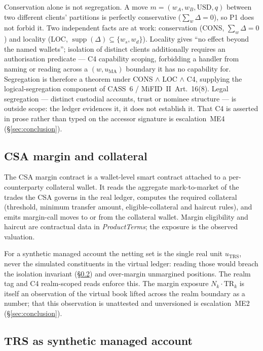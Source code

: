 \documentclass[11pt,a4paper]{article}
\begin{document}
Conservation alone is not segregation. A move $m=(w_A,w_B,\text{USD},q)$ between two different
clients' partitions is perfectly conservative ($\sum_w\Delta=0$), so P1 does not forbid it. Two
independent facts are at work: conservation (CONS, $\sum_w\Delta=0$) and locality (LOC,
$\operatorname{supp}(\Delta)\subseteq\{w_s,w_d\}$). Locality gives ``no effect beyond the named
wallets''; isolation of distinct clients additionally requires an authorisation predicate --- C4
capability scoping, forbidding a handler from naming or reading across a $(w,u_{\mathrm{MA}})$
boundary it has no capability for. Segregation is therefore a theorem under CONS $\wedge$ LOC
$\wedge$ C4, supplying the logical-segregation component of CASS~6 / MiFID~II~Art.~16(8). Legal
segregation --- distinct custodial accounts, trust or nominee structure --- is outside scope: the
ledger evidences it, it does not establish it. That C4 is asserted in prose rather than typed on
the accessor signature is escalation~ME4 (\S\ref{sec:conclusion}).

\subsection{CSA margin and collateral}
\label{sec:managed-csa}

The CSA margin contract is a wallet-level smart contract attached to a per-counterparty collateral
wallet. It reads the aggregate mark-to-market of the trades the CSA governs in the real ledger,
computes the required collateral (threshold, minimum transfer amount, eligible-collateral and
haircut rules), and emits margin-call moves to or from the collateral wallet. Margin eligibility
and haircut are contractual data in \textit{ProductTerms}; the exposure is the observed valuation.

For a synthetic managed account the netting set is the single real unit $u_{\mathrm{TRS}}$, never
the simulated constituents in the virtual ledger: reading those would breach the isolation
invariant (\S\ref{sec:managed-trs}) and over-margin unmargined positions. The realm tag and C4
realm-scoped reads enforce this. The margin exposure $N_k\cdot\mathrm{TR}_k$ is itself an
observation of the virtual book lifted across the realm boundary as a number; that this
observation is unattested and unversioned is escalation~ME2 (\S\ref{sec:conclusion}).

\subsection{TRS as synthetic managed account}
\label{sec:managed-trs}
\end{document}
